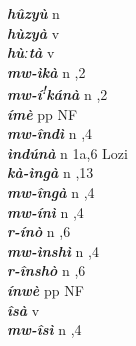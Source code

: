 \begin{multicols}{2}
{{\bfseries\itshape hûzyù}} \relax  n   \relax  {} \relax   \relax  \\
{{\bfseries\itshape hùzyà}} \relax  v  \relax   \relax  {} \relax   \relax  \\
{{\bfseries\itshape hùːtà}} \relax  v  \relax   \relax  {} \relax   \relax  \\
{{\bfseries\itshape mw-ìkà}} \relax  n  ,2  \relax   \relax  \\
{{\bfseries\itshape mw-í\textsuperscript{!}kánà}} \relax  n  ,2  \relax   \relax  \\
{{\bfseries\itshape ímè}} \relax  pp  \relax   \relax  {} \relax  NF \relax  \\
{{\bfseries\itshape mw-îndì}} \relax  n  ,4  \relax   \relax  \\
{{\bfseries\itshape ìndúnà}} \relax  n  \relax  1a,6  \relax  Lozi \relax  \\
{{\bfseries\itshape kà-ìngà}} \relax  n  ,13  \relax   \relax  \\
{{\bfseries\itshape mw-îngà}} \relax  n  ,4  \relax   \relax  \\
{{\bfseries\itshape mw-ínì}} \relax  n  ,4  \relax   \relax  \\
{{\bfseries\itshape r-ínò}} \relax  n  ,6  \relax   \relax  \\
{{\bfseries\itshape mw-ìnshì}} \relax  n  ,4  \relax   \relax  \\
{{\bfseries\itshape r-înshò}} \relax  n  ,6  \relax   \relax  \\
{{\bfseries\itshape ínwè}} \relax  pp  \relax   \relax  {} \relax  NF \relax  \\
{{\bfseries\itshape îsà}} \relax  v  \relax   \relax  {} \relax   \relax  \\
{{\bfseries\itshape mw-îsì}} \relax  n  ,4  \relax   \relax  \\

\end{multicols}
